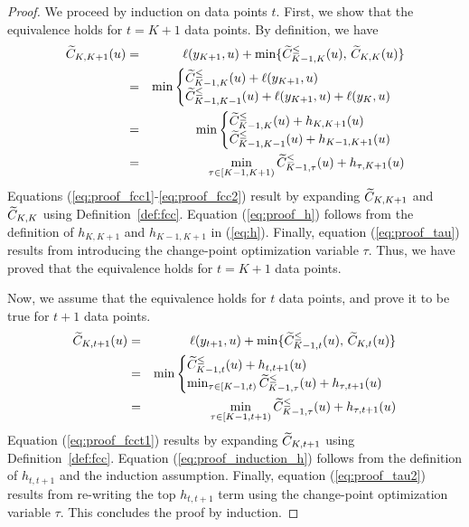 \documentclass{article}
\begin{document}
\begin{proof}
  We proceed by induction on data points $t$. First, we show that the
  equivalence holds for $t=K+1$ data points. By definition, we have
  \begin{eqnarray}
    \widetilde{C}_{K,K+1}(u)
    &=&\label{eq:proof_fcc1}\ell(y_{K+1},u)+\min\{\widetilde{C}_{K-1,K}^\leq(u),\,\widetilde{C}_{K,K}(u)\}\\
    &=&\min\label{eq:proof_fcc2}
        \begin{cases}
          \widetilde{C}_{K-1,K}^\leq(u)+\ell(y_{K+1},u)\\
          \widetilde{C}_{K-1,K-1}^\leq(u)+\ell(y_{K+1},u)+\ell(y_K,u)
        \end{cases}\\
    &=&\min\label{eq:proof_h}
        \begin{cases}
          \widetilde{C}_{K-1,K}^\leq(u)+h_{K,K+1}(u)\\
          \widetilde{C}_{K-1,K-1}^\leq(u)+h_{K-1,K+1}(u)
        \end{cases}\\
    \label{eq:proof_tau}
    &=&\min_{\tau\in[K-1,K+1)} \widetilde{C}_{K-1,\tau}^\leq(u)+h_{\tau,K+1}(u)
  \end{eqnarray}
  Equations (\ref{eq:proof_fcc1}-\ref{eq:proof_fcc2}) result by
  expanding $\widetilde{C}_{K,K+1}$ and $\widetilde{C}_{K,K}$ using
  Definition~\ref{def:fcc}. Equation (\ref{eq:proof_h}) follows from
  the definition of $h_{K,K+1}$ and $h_{K-1,K+1}$ in
  (\ref{eq:h}). Finally, equation (\ref{eq:proof_tau}) results from
  introducing the change-point optimization variable $\tau$. Thus, we
  have proved that the equivalence holds for $t=K+1$ data points.

  Now, we
  assume that the equivalence holds for $t$ data points, and prove it to be true
  for $t+1$ data points.
  \begin{eqnarray}
    \widetilde{C}_{K,t+1}(u)\label{eq:proof_fcct1}
    &=&\ell(y_{t+1},u)+\min\{\widetilde{C}_{K-1,t}^\leq(u),\,\widetilde{C}_{K,t}(u)\}\\
    &=&\min\label{eq:proof_induction_h}
        \begin{cases}
          \widetilde{C}_{K-1,t}^\leq(u)+h_{t,t+1}(u)\\
          \min_{\tau\in[K-1,t)} \widetilde{C}^\leq_{K-1,\tau}(u)+h_{\tau,t+1}(u)
        \end{cases}\\
    &=&\min_{\tau\in[K-1,t+1)} \widetilde{C}^\leq_{K-1,\tau}(u)+h_{\tau,t+1}(u)
        \label{eq:proof_tau2}
  \end{eqnarray}
  Equation (\ref{eq:proof_fcct1}) results by expanding $\widetilde{C}_{K,t+1}$
  using Definition~\ref{def:fcc}. Equation
  (\ref{eq:proof_induction_h}) follows from the definition of
  $h_{t,t+1}$ and the induction assumption. Finally, equation
  (\ref{eq:proof_tau2}) results from re-writing the top $h_{t,t+1}$ term using the
  change-point optimization variable $\tau$.  This concludes the proof
  by induction.
\end{proof}
\end{document}
